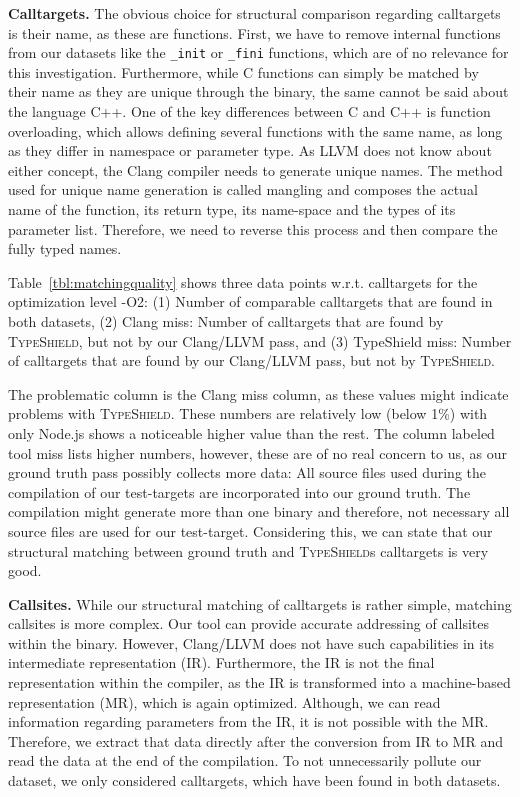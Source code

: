 \textbf{Calltargets.} The obvious choice for structural comparison regarding calltargets is their name, as these are functions. First, we have to remove internal 
functions from our datasets like the \texttt{\_init} or \texttt{\_fini} functions, which are of no relevance for this investigation. Furthermore, while C functions can
simply be matched by their name as they are unique through the binary, the same cannot be said about the language C++. One of the key differences between C and C++ is 
function overloading, which allows defining several functions with the same name, as long as they differ in namespace or parameter type. 
As LLVM does not know about either concept, the Clang compiler needs to generate unique names. The method used for unique name generation is called mangling and composes
the actual name of the function, its return type, its name-space and the types of its parameter list. Therefore, we need to reverse this process and then compare the fully
typed names. 

Table~\ref{tbl:matchingquality} shows three data points w.r.t. calltargets for the optimization level -O2:
(1) Number of comparable calltargets that are found in both datasets, 
(2) Clang miss: Number of calltargets that are found by \textsc{TypeShield}, but not by our Clang/LLVM pass, and 
(3) TypeShield miss: Number of calltargets that are found by our Clang/LLVM pass, but not by \textsc{TypeShield}.

The problematic column is the Clang miss column, as these values might indicate problems with \textsc{TypeShield}. These numbers are relatively low (below 1\%) with only Node.js
shows a noticeable higher value than the rest. The column labeled tool miss lists higher numbers, however, these are of no real concern to us, as our ground truth 
pass possibly collects more data: All source files used during the compilation of our test-targets are incorporated into our ground truth. The compilation might generate more than
one binary and therefore, not necessary all source files are used for our test-target.
Considering this, we can state that our structural matching between ground truth and \textsc{TypeShield}s calltargets is very good.

\textbf{Callsites.} While our structural matching of calltargets is rather simple, matching callsites is more complex. Our tool can provide accurate addressing of 
callsites within the binary. However, Clang/LLVM does not have such capabilities in its intermediate representation (IR). Furthermore, the IR is not the final representation within
the compiler, as the IR is transformed into a machine-based representation (MR), which is again optimized. Although, we can read information regarding parameters from the IR, it 
is not possible with the MR. Therefore, we extract that data directly after the conversion from IR to MR and read the data at the end of the compilation. To not unnecessarily 
pollute our dataset, we only considered calltargets, which have been found in both datasets. 

